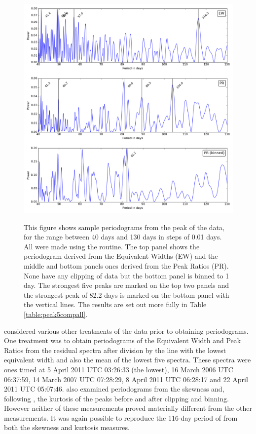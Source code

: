 \begin{figure}[!htbp]
\begin{center}
\includegraphics[scale=0.18]{Figures/summpgrams.png} \\
\end{center}   
\caption{This figure shows sample periodograms from the {\ha} peak of the {\harps} data, for the range between 40 days
  and 130 days in steps of 0.01 days. All were made using the {\gatspy} routine.  The top panel shows the periodogram
  derived from the Equivalent Widths (EW) and the middle and bottom panels ones derived from the Peak Ratios (PR). None
  have any clipping of data but the bottom panel is binned to 1 day.  The strongest five peaks are marked on the top two
  panels and the strongest peak of 82.2 days is marked on the bottom panel with the vertical lines.  The results are set
  out more fully in Table \ref{table:peak5compall}.}
\protect\label{fig:harpspgrams1}
\end{figure}

{\FirstP} considered various other treatments of the data prior to obtaining periodograms. One treatment was to obtain
periodograms of the Equivalent Width and Peak Ratios from the residual spectra after division by the line with the
lowest equivalent width and also the mean of the lowest five spectra. These spectra were ones timed at 5 April 2011 UTC
03:26:33 (the lowest), 16 March 2006 UTC 06:37:59, 14 March 2007 UTC 07:28:29, 8 April 2011 UTC 06:28:17 and 22 April
2011 UTC 05:07:46. {\FirstP} also examined periodograms from the skewness and, following \citet{flores16},
the kurtosis of the {\ha} peaks before and after clipping and binning. However neither of these measurements proved
materially different from the other measurements. It was again possible to reproduce the 116-day period of
\citet{suarezmascareno15} from both the skewness and kurtosis measures.

